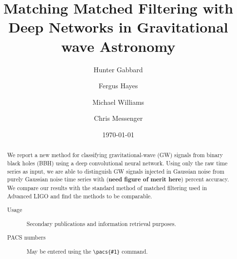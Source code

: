 \documentclass[%
 amsmath,amssymb,
 aps,
 twocolumn,
]{revtex4-1}
\begin{document}

\title{Matching Matched Filtering with Deep Networks in Gravitational wave Astronomy}%

\author{Hunter Gabbard}%
\author{Fergus Hayes}
\author{Michael Williams}%
\author{Chris Messenger}
%

\date{\today}%

\begin{abstract}
 We report a new method for classifying gravitational-wave (GW) signals from binary black holes (BBH) using a deep convolutional neural network. Using only the raw time series as input, we are able to distinguish GW signals injected in Gaussian noise from purely Gaussian noise time series with (\textbf{need figure of merit here}) percent accuracy. We compare our results with the standard method of matched filtering used in Advanced LIGO and find the methods to be comparable.  
\begin{description}
\item[Usage]
Secondary publications and information retrieval purposes.
\item[PACS numbers]
May be entered using the \verb+\pacs{#1}+ command.
\end{description}
\end{abstract}

\maketitle



\end{document}
